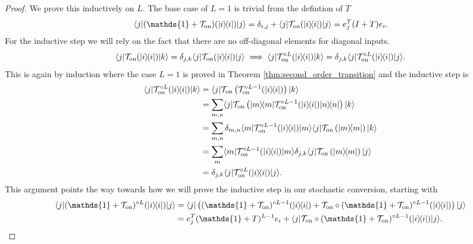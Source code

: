 \documentclass{article}
\newcommand{\on}{\rm on}
\newcommand{\ket}[1]{|#1\rangle}
\newcommand{\bra}[1]{\langle #1|}
\newcommand{\ketbra}[2]{| #1\rangle\! \langle #2|}
\newcommand{\identity}{\mathds{1}}
\begin{document}
\begin{proof}
    We prove this inductively on $L$. The base case of $L = 1$ is trivial from the defintion of $T$
    \begin{align}
    \bra{j} (\identity + \mathcal{T}_{\on})(\ketbra{i}{i}) \ket{j} = \delta_{i,j} + \bra{j} \mathcal{T}_{\on}(\ketbra{i}{i}) \ket{j} = e_j^T (I +  T) e_i.
\end{align}
For the inductive step we will rely on the fact that there are no off-diagonal elements for diagonal inputs. 
\begin{align}
    \bra{j} \mathcal{T}_{\on} (\ketbra{i}{i}) \ket{k} = \delta_{j,k} \bra{j} \mathcal{T}_{\on} (\ketbra{i}{i}) \ket{j} \implies \bra{j} \mathcal{T}_{\on}^{\circ L} (\ketbra{i}{i}) \ket{k} = \delta_{j,k} \bra{j} \mathcal{T}_{\on}^{\circ L} (\ketbra{i}{i}) \ket{j}.
\end{align}
This is again by induction where the case $L = 1$ is proved in Theorem \ref{thm:second_order_transition} and the inductive step is 
\begin{align}
    \bra{j} \mathcal{T}_{\on}^{\circ L} (\ketbra{i}{i}) \ket{k} &= \bra{j} \mathcal{T}_{\on} \left( \mathcal{T}_{\on}^{\circ L - 1} (\ketbra{i}{i}) \right) \ket{k} \\
    &= \sum_{m, n} \bra{j} \mathcal{T}_{\on}\left( \ketbra{m}{m}\mathcal{T}_{\on}^{\circ L - 1}(\ketbra{i}{i}) \ketbra{n}{n}\right) \ket{k} \\
    &= \sum_{m, n} \delta_{m,n} \bra{m}\mathcal{T}_{\on}^{\circ L - 1}(\ketbra{i}{i}) \ket{m} \bra{j} \mathcal{T}_{\on}\left(   \ketbra{m}{m} \right) \ket{k} \\
    &= \sum_{m} \bra{m}\mathcal{T}_{\on}^{\circ L - 1}(\ketbra{i}{i}) \ket{m} \delta_{j,k} \bra{j} \mathcal{T}_{\on}\left(   \ketbra{m}{m} \right) \ket{j} \\
    &= \delta_{j,k} \bra{j} \mathcal{T}_{\on}^{\circ L} (\ketbra{i}{i}) \ket{j}.
\end{align} 
This argument points the way towards how we will prove the inductive step in our stochastic conversion, starting with
\begin{align}
    \bra{j} (\identity + \mathcal{T}_{\on})^{\circ L}(\ketbra{i}{i}) \ket{j} &= \bra{j} \left( (\identity + \mathcal{T}_{\on})^{\circ L - 1} (\ketbra{i}{i}) + \mathcal{T}_{\on} \circ (\identity + \mathcal{T}_{\on})^{\circ L - 1} (\ketbra{i}{i}) \right)\ket{j} \\
    &= e_j^T (\identity + T)^{L - 1} e_i + \bra{j} \mathcal{T}_{\on} \circ (\identity + \mathcal{T}_{\on})^{\circ L - 1} (\ketbra{i}{i}) \ket{j} . \label{eq:matrix_reloaded1}

\end{align}
\end{proof}
\end{document}
